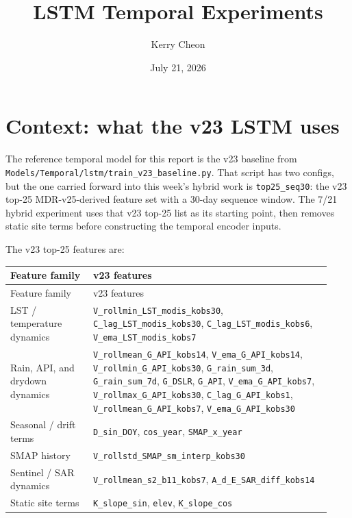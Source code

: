 \documentclass[11pt]{article}
\title{LSTM Temporal Experiments}
\author{Kerry Cheon}
\date{July 21, 2026}
\newcommand{\code}[1]{\begingroup\footnotesize\nolinkurl{#1}\endgroup}
\begin{document}
\maketitle

\section{Context: what the v23 LSTM uses}

The reference temporal model for this report is the v23 baseline from \code{Models/Temporal/lstm/train_v23_baseline.py}. That script has two configs, but the one carried forward into this week's hybrid work is \code{top25_seq30}: the v23 top-25 MDR-v25-derived feature set with a 30-day sequence window. The 7/21 hybrid experiment uses that v23 top-25 list as its starting point, then removes static site terms before constructing the temporal encoder inputs.

The v23 top-25 features are:

\begin{center}
\footnotesize
\setlength{\tabcolsep}{2pt}
\renewcommand{\arraystretch}{1.16}
\begin{longtable}{>{\RaggedRight\arraybackslash}p{0.240\linewidth}>{\RaggedRight\arraybackslash}p{0.690\linewidth}}
\toprule
Feature family & v23 features \\
\midrule
\endfirsthead
\toprule
Feature family & v23 features \\
\midrule
\endhead
LST / temperature dynamics & \code{V_rollmin_LST_modis_kobs30}, \code{C_lag_LST_modis_kobs30}, \code{C_lag_LST_modis_kobs6}, \code{V_ema_LST_modis_kobs7} \\
Rain, API, and drydown dynamics & \code{V_rollmean_G_API_kobs14}, \code{V_ema_G_API_kobs14}, \code{V_rollmin_G_API_kobs30}, \code{G_rain_sum_3d}, \code{G_rain_sum_7d}, \code{G_DSLR}, \code{G_API}, \code{V_ema_G_API_kobs7}, \code{V_rollmax_G_API_kobs30}, \code{C_lag_G_API_kobs1}, \code{V_rollmean_G_API_kobs7}, \code{V_ema_G_API_kobs30} \\
Seasonal / drift terms & \code{D_sin_DOY}, \code{cos_year}, \code{SMAP_x_year} \\
SMAP history & \code{V_rollstd_SMAP_sm_interp_kobs30} \\
Sentinel / SAR dynamics & \code{V_rollmean_s2_b11_kobs7}, \code{A_d_E_SAR_diff_kobs14} \\
Static site terms & \code{K_slope_sin}, \code{elev}, \code{K_slope_cos} \\
\bottomrule
\end{longtable}
\end{center}
\end{document}
